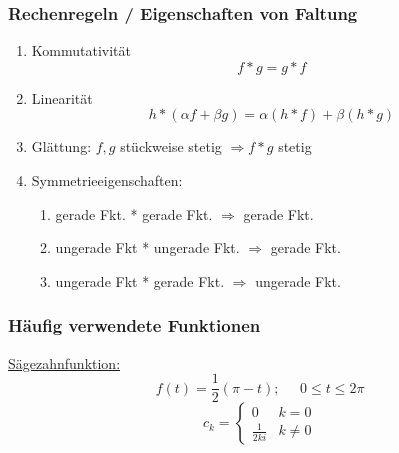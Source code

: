 \documentclass[a4paper,twocolumn,10pt]{article}
\begin{document}
\subsubsection{Rechenregeln / Eigenschaften von Faltung}
\begin{enumerate}[label=$\bullet$]
\item Kommutativität
\begin{equation*}
f*g=g*f
\end{equation*}
\item Linearität
\begin{equation*}
h*(\alpha f+\beta g)=\alpha(h*f)+\beta(h*g)
\end{equation*}
\item Glättung: $f,g$ stückweise stetig $\Rightarrow f*g$ stetig
\item Symmetrieeigenschaften:
\begin{enumerate}[label=-]
\item gerade Fkt. * gerade Fkt. $\Rightarrow$ gerade Fkt.
\item ungerade Fkt * ungerade Fkt. $\Rightarrow$ gerade Fkt.
\item ungerade Fkt * gerade Fkt. $\Rightarrow$ ungerade Fkt.
\end{enumerate}
\end{enumerate}

\subsubsection{Häufig verwendete Funktionen}
\underline{Sägezahnfunktion:}
\begin{equation*}
f(t)=\frac{1}{2}(\pi-t);\;\;\;\;\;0\leq t\leq 2\pi
\end{equation*}
\begin{equation*}
c_k=\begin{cases}0 & k=0 \\ \frac{1}{2ki} & k\neq 0\end{cases}
\end{equation*}
\end{document}
